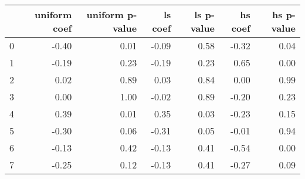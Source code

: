 \begin{tabular}{lrrrrrr}
\toprule
 & uniform coef & uniform p-value & ls coef & ls p-value & hs coef & hs p-value \\
\midrule
0 & -0.40 & 0.01 & -0.09 & 0.58 & -0.32 & 0.04 \\
1 & -0.19 & 0.23 & -0.19 & 0.23 & 0.65 & 0.00 \\
2 & 0.02 & 0.89 & 0.03 & 0.84 & 0.00 & 0.99 \\
3 & 0.00 & 1.00 & -0.02 & 0.89 & -0.20 & 0.23 \\
4 & 0.39 & 0.01 & 0.35 & 0.03 & -0.23 & 0.15 \\
5 & -0.30 & 0.06 & -0.31 & 0.05 & -0.01 & 0.94 \\
6 & -0.13 & 0.42 & -0.13 & 0.41 & -0.54 & 0.00 \\
7 & -0.25 & 0.12 & -0.13 & 0.41 & -0.27 & 0.09 \\
\bottomrule
\end{tabular}
